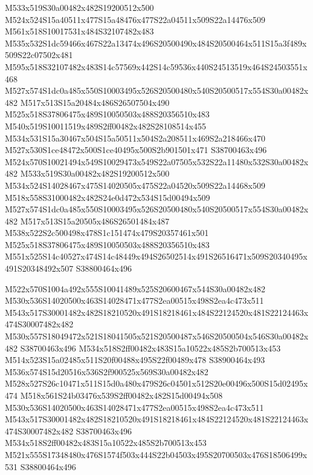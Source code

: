 \documentclass{article}
\begin{document}
\begin{multicols}{2}
M533x519S30a00482x482S19200512x500 M524x524S15a40511x477S15a48476x477S22a04511x509S22a14476x509 M561x518S10017531x484S32107482x483 M535x532S1dc59466x467S22a13474x496S20500490x484S20500464x511S15a3f489x509S22c07502x481 M595x518S32107482x483S14c57569x442S14c59536x440S24513519x464S24503551x468 M527x574S1dc0a485x550S10003495x526S20500480x540S20500517x554S30a00482x482 M517x513S15a20484x486S26507504x490 M525x518S37806475x489S10050503x488S20356510x483 M540x519S10011519x489S2ff00482x482S28108514x455 M534x531S15a30467x504S15a50511x504S2a208511x469S2a218466x470 M527x530S1ce48472x500S1ce40495x500S2b901501x471 S38700463x496 M524x570S10021494x549S10029473x549S22a07505x532S22a11480x532S30a00482x482 M533x519S30a00482x482S19200512x500 M534x524S14028467x475S14020505x475S22a04520x509S22a14468x509 M518x558S31000482x482S24e0d472x534S15d00494x509 M527x574S1dc0a485x550S10003495x526S20500480x540S20500517x554S30a00482x482 M517x513S15a20505x486S26501484x487 M538x522S2c500498x478S1c151474x479S20357461x501 M525x518S37806475x489S10050503x488S20356510x483 M551x525S14c40527x474S14c48449x494S26502514x491S26516471x509S20340495x491S20348492x507 S38800464x496

M522x570S1004a492x555S10041489x525S20600467x544S30a00482x482 M530x536S14020500x463S14028471x477S2ea00515x498S2ea4c473x511 M543x517S30001482x482S18210520x491S18218461x484S22124520x481S22124463x474S30007482x482 M530x557S18049472x521S18041505x521S20500487x546S20500504x546S30a00482x482 S38700463x496 M534x518S2ff00482x483S15a10522x485S2b700513x453 M514x523S15a02485x511S20f00488x495S22f00489x478 S38900464x493 M536x574S15d20516x536S2f900525x569S30a00482x482 M528x527S26c10471x511S15d0a480x479S26c04501x512S20e00496x500S15d02495x474 M518x561S24b03476x539S2ff00482x482S15d00494x508 M530x536S14020500x463S14028471x477S2ea00515x498S2ea4c473x511 M543x517S30001482x482S18210520x491S18218461x484S22124520x481S22124463x474S30007482x482 S38700463x496 M534x518S2ff00482x483S15a10522x485S2b700513x453 M521x555S17348480x476S1574f503x444S22b04503x495S20700503x476S18506499x531 S38800464x496


\end{multicols}
\end{document}
